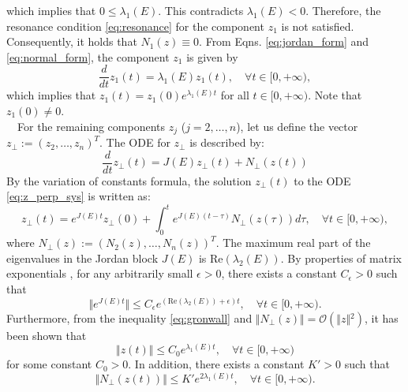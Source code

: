 \documentclass[11pt,a4paper]{article}
\begin{document}
which implies that $0 \le \lambda_1(E)$. This contradicts $\lambda_1(E) < 0$. Therefore, the resonance condition \eqref{eq:resonance} for the component $z_1$ is not satisfied. Consequently, it holds that $N_1(z) \equiv 0$. From Eqns. \eqref{eq:jordan_form} and \eqref{eq:normal_form}, the component $z_1$ is given by
\begin{equation}
\frac{d}{dt}z_1(t) = \lambda_1(E) z_1(t), \quad \forall t \in [0,+\infty),\label{eq:z1_linear}
\end{equation}
which implies that $z_1(t) = z_1(0) e^{\lambda_1(E) t}$ for all $t \in [0,+\infty)$. Note that $z_1(0) \not =0$.\\
~~For the remaining components $z_j$ ($j = 2,\ldots,n$), let us define the vector $z_{\perp} := (z_2, \dots, z_n)^T$. The ODE for $z_{\perp}$ is described by:
\begin{equation}
\frac{d}{dt}z_{\perp}(t) = J(E) z_{\perp}(t) + N_{\perp}(z(t)) \label{eq:z_perp_sys}
\end{equation}
By the variation of constants formula, the solution $z_{\perp}(t)$ to the ODE \eqref{eq:z_perp_sys} is written as:
\begin{equation}
z_{\perp}(t) = e^{J(E)t} z_{\perp}(0) + \int_0^t e^{J(E)(t-\tau)} N_{\perp}(z(\tau)) d\tau,\quad \forall t \in [0,+\infty), \label{eq:var_constants}
\end{equation}
where $N_{\perp}(z):=(N_2(z), \dots, N_n(z))^T$. The maximum real part of the eigenvalues in the Jordan block $J(E)$ is $\mathrm{Re}(\lambda_2(E))$. By properties of matrix exponentials \cite{LawrencePerko}, for any arbitrarily small $\epsilon > 0$, there exists a constant $C_{\epsilon} > 0$ such that
\begin{equation}
\Vert{}e^{J(E)t}\Vert{} \le C_{\epsilon} e^{(\mathrm{Re}(\lambda_2(E)) + \epsilon)t}, \quad \forall t \in [0,+\infty). \label{eq:jordan_bound-1}
\end{equation}
Furthermore, from the  inequality \eqref{eq:gronwall} and $\Vert{}N_{\perp}(z)\Vert{} = \mathcal{O}(\Vert{}z\Vert{}^2)$, it has been shown that 
\begin{equation}
\Vert{}z(t)\Vert{} \le C_0 e^{\lambda_1(E)t},\quad \forall t \in [0,+\infty)\label{eq:jordan_bound-2}
\end{equation}
for some constant $C_0 > 0$. In addition, there exists a constant $K' > 0$ such that 
\begin{equation}
\Vert{}N_{\perp}(z(t))\Vert{} \le K' e^{2\lambda_1(E)t},\quad \forall t \in [0,+\infty).\label{eq:jordan_bound-3}
\end{equation}
\end{document}
